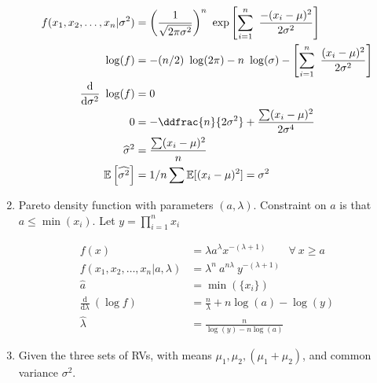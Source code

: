 \begin{enumerate}
	\begin{subequations}
	\begin{align}
		f(x_1, x_2, \dots, x_n | \sigma^2) &= \left(\frac{1}{\sqrt{2\pi\sigma^2}}\right)^n\ \exp \left[\sum\limits_{i=1}^{n}\ \frac{-(x_i - \mu)^2}{2\sigma^2}\right] \nonumber \\
		\log(f) &= -(n/2)\ \log(2\pi) - n\ \log(\sigma) - \left[\sum\limits_{i=1}^{n}\ \frac{(x_i - \mu)^2}{2\sigma^2}\right] \\
		\frac{\mathrm{d}}{\mathrm{d} \sigma^2}\ \log(f) &= 0 \nonumber \\
		0 &= -\ddfrac{n}{2\sigma^2} + \frac{\sum (x_i - \mu)^2}{2\sigma^4} \nonumber \\
		\widehat{\sigma}^2 &= \frac{\sum (x_i - \mu)^2}{n} \\
		\mathbb{E}\left[\widehat{\sigma^2}\right] &= 1/n \sum \mathbb{E}[(x_i - \mu)^2] = \sigma^2
	\end{align}
	\end{subequations}
	\item Pareto density function with parameters $ (a, \lambda) $. Constraint on $ a $ is that $ a \leq \min({x_i}) $.
	Let $ y = \prod\limits_{i=1}^{n} x_i $
	
	\begin{subequations}
	\begin{align}
		f(x) &= \lambda a^\lambda x^{-(\lambda+1)} \qquad \forall\ x \geq a \nonumber \\
		f(x_1, x_2, \dots, x_n | a, \lambda) &= \lambda^n\ a^{n\lambda}\ y^{-(\lambda + 1)} \\
		\widehat{a} &= \min(\{x_i\}) \\
		\frac{\mathrm{d}}{\mathrm{d} \lambda}\ (\log f) &= \frac{n}{\lambda} + n \log (a) - \log (y) \nonumber \\
		\widehat{\lambda} &= \frac{n}{\log (y) - n \log (a)}
	\end{align}
	\end{subequations}

	\item Given the three sets of RVs, with means $ \mu_1, \mu_2, (\mu_1 + \mu_2) $, and common variance $ \sigma^2 $.
	

\end{enumerate}
